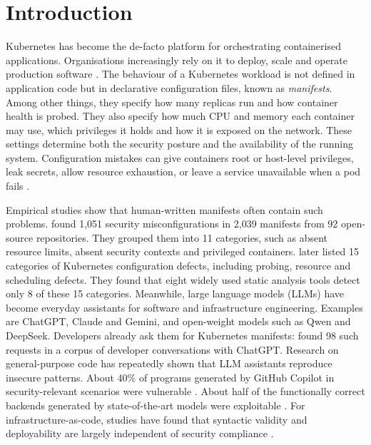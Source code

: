 \section{Introduction}\label{sec:intro}

Kubernetes has become the de-facto platform for orchestrating containerised applications. Organisations increasingly rely on it to deploy, scale and operate production software \citep{rahman2023k8smisconfig,shamim2020xicommandments}. The behaviour of a Kubernetes workload is not defined in application code but in declarative configuration files, known as \emph{manifests}. Among other things, they specify how many replicas run and how container health is probed. They also specify how much CPU and memory each container may use, which privileges it holds and how it is exposed on the network. These settings determine both the security posture and the availability of the running system. Configuration mistakes can give containers root or host-level privileges, leak secrets, allow resource exhaustion, or leave a service unavailable when a pod fails \citep{rahman2023k8smisconfig,zhang2026k8sconfigdefects,nsacisa2022k8shardening}.

Empirical studies show that human-written manifests often contain such problems. \citet{rahman2023k8smisconfig} found 1,051 security misconfigurations in 2,039 manifests from 92 open-source repositories. They grouped them into 11 categories, such as absent resource limits, absent security contexts and privileged containers. \citet{zhang2026k8sconfigdefects} later listed 15 categories of Kubernetes configuration defects, including probing, resource and scheduling defects. They found that eight widely used static analysis tools detect only 8 of these 15 categories. Meanwhile, large language models (LLMs) have become everyday assistants for software and infrastructure engineering. Examples are ChatGPT, Claude and Gemini, and open-weight models such as Qwen and DeepSeek. Developers already ask them for Kubernetes manifests: \citet{zhang2024genaismells} found 98 such requests in a corpus of developer conversations with ChatGPT. Research on general-purpose code has repeatedly shown that LLM assistants reproduce insecure patterns. About 40\% of programs generated by GitHub Copilot in security-relevant scenarios were vulnerable \citep{pearce2022asleep}. About half of the functionally correct backends generated by state-of-the-art models were exploitable \citep{vero2025baxbench}. For infrastructure-as-code, studies have found that syntactic validity and deployability are largely independent of security compliance \citep{santosvargas2026secureterraform,zhang2026iacgen}.

